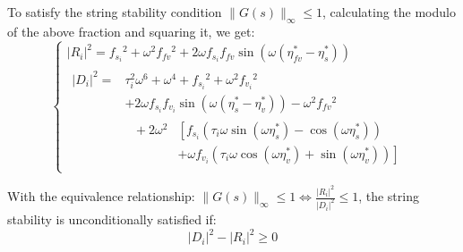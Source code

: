 \documentclass[journal]{IEEEtran}
\begin{document}
To satisfy the string stability condition $\parallel G\left(s\right)\parallel_\infty\le1$, calculating the modulo of the above fraction and squaring it, we get:
\begin{equation}
  \left\{\begin{array}{l}
    \left|R_{i}\right|^{2}=f_{s_{i}}{ }^{2}+\omega^{2} f_{f v}{ }^{2}+2 \omega f_{s_{i}} f_{f v} \sin \left(\omega\left(\eta_{f v}^{*}-\eta_{s}^{*}\right)\right) \\
    \begin{aligned}
      \left|D_{i}\right|^{2}= & \tau_{i}^{2} \omega^{6}+\omega^{4}+f_{s_{i}}{ }^{2}+\omega^{2} f_{v_{i}}{ }^{2}                                        \\
                              & +2 \omega f_{s_{i}} f_{v_{i}} \sin \left(\omega\left(\eta_{s}^{*}-\eta_{v}^{*}\right)\right)-\omega^{2} f_{f v}{ }^{2} \\
                              & \begin{aligned}
        \;+2 \omega^2 & \left[  f_{s_i}\left(\tau_i \omega \sin \left(\omega \eta_s^*\right)-\cos \left(\omega \eta_s^*\right)\right)\right.       \\
                      & \left.+\omega f_{v_i}\left(\tau_i \omega \cos \left(\omega \eta_v^*\right)+\sin \left(\omega \eta_v^*\right)\right)\right]
      \end{aligned}
    \end{aligned}
  \end{array}\right.
  \label{Eq28}
\end{equation}

With the equivalence relationship: $\parallel G\left(s\right)\parallel_\infty\le1\Longleftrightarrow\frac{\left|R_i\right|^2}{\left|D_i\right|^2}\le1$, the string stability is unconditionally satisfied if:
\begin{equation}
  {\left| {{D_i}} \right|^2} - {\left| {{R_i}} \right|^2} \geqslant 0
  \label{Eq29}
\end{equation}
\end{document}
